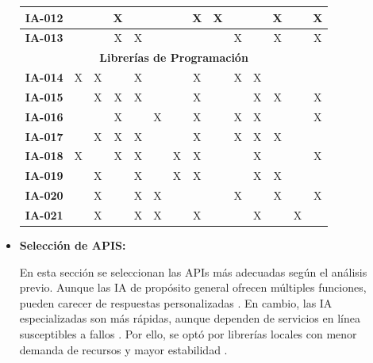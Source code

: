 \documentclass[lettersize,journal]{IEEEtran}
\begin{document}
\begin{itemize}
\begin{table}[H]
{\begin{tabular}{|c|*{13}{c|}}
			\hline
			\textbf{IA-012} & \checkmark & \checkmark & X & \checkmark & \checkmark & \checkmark & X & X & \checkmark & \checkmark & X & \checkmark & X \\ 
			\hline
			\textbf{IA-013} & \checkmark & \checkmark & X & X & \checkmark & \checkmark & \checkmark & \checkmark & X & \checkmark & X & \checkmark & X \\ 
			\hline
			\multicolumn{14}{|c|}{\textbf{Librerías de Programación}} \\ 
			\hline
			\textbf{IA-014} & X & X & \checkmark & X & \checkmark & \checkmark & X & \checkmark & X & X & \checkmark & \checkmark & \checkmark \\ 
			\hline
			\textbf{IA-015} & \checkmark & X & X & X & \checkmark & \checkmark & X & \checkmark & \checkmark & X & X & \checkmark & X \\ 
			\hline
			\textbf{IA-016} & \checkmark & \checkmark & X & \checkmark & X & \checkmark & X & \checkmark & X & X & \checkmark & \checkmark & X \\ 
			\hline
			\textbf{IA-017} & \checkmark & X & X & X & \checkmark & \checkmark & X & \checkmark & X & X & X & \checkmark & \checkmark \\ 
			\hline
			\textbf{IA-018} & X & \checkmark & X & X & \checkmark & X & X & \checkmark & \checkmark & X & \checkmark & \checkmark & X \\ 
			\hline
			\textbf{IA-019} & \checkmark & X & \checkmark & X & \checkmark & X & X & \checkmark & \checkmark & X & X & \checkmark & \checkmark \\ 
			\hline
			\textbf{IA-020} & \checkmark & X & \checkmark & X & X & \checkmark & \checkmark & \checkmark & X & \checkmark & X & \checkmark & X \\ 
			\hline
			\textbf{IA-021} & \checkmark & X & \checkmark & X & X & \checkmark & X & \checkmark & \checkmark & X & \checkmark & X & \checkmark \\ 
			\hline
		\end{tabular}
	}
	\end{table}
	
	\item \textbf{Selección de APIS:} 
	
	\noindent En esta sección se seleccionan las APIs más adecuadas según el análisis previo. Aunque las IA de propósito general ofrecen múltiples funciones, pueden carecer de respuestas personalizadas \cite{Hashana2023}. En cambio, las IA especializadas son más rápidas, aunque dependen de servicios en línea susceptibles a fallos \cite{Varoquaux2025}. Por ello, se optó por librerías locales con menor demanda de recursos y mayor estabilidad \cite{Liu2024}.
	

\end{itemize}
\end{document}
